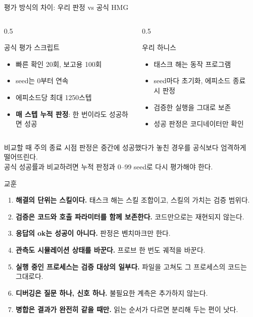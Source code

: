 \documentclass[aspectratio=169,10pt]{beamer}
\begin{document}
\begin{frame}{평가 방식의 차이: 우리 판정 vs 공식 HMG}
  \begin{columns}[T]
    \begin{column}{0.5\textwidth}
      \begin{block}{공식 평가 스크립트}
        \begin{itemize}
          \item 빠른 확인 20회, 보고용 100회
          \item seed는 0부터 연속
          \item 에피소드당 최대 1250스텝
          \item \textbf{매 스텝 누적 판정}: 한 번이라도 성공하면 성공
        \end{itemize}
      \end{block}
    \end{column}
    \begin{column}{0.5\textwidth}
      \begin{block}{우리 하니스}
        \begin{itemize}
          \item 태스크 해는 동작 프로그램
          \item seed마다 초기화, 에피소드 종료 시 판정
          \item 검증한 실행을 그대로 보존
          \item 성공 판정은 코디네이터만 확인
        \end{itemize}
      \end{block}
    \end{column}
  \end{columns}

  \vspace{0.5em}
  \begin{alertblock}{비교할 때 주의}
    종료 시점 판정은 중간에 성공했다가 놓친 경우를 공식보다 엄격하게 떨어뜨린다.\\
    공식 성공률과 비교하려면 누적 판정과 0--99 seed로 다시 평가해야 한다.
  \end{alertblock}
\end{frame}

\begin{frame}{교훈}
  \begin{enumerate}
    \item \textbf{해결의 단위는 스킬이다.} 태스크 해는 스킬 조합이고, 스킬의 가치는 검증 범위다.
    \item \textbf{검증은 코드와 호출 파라미터를 함께 보존한다.} 코드만으로는 재현되지 않는다.
    \item \textbf{응답의 ok는 성공이 아니다.} 판정은 벤치마크만 한다.
    \item \textbf{관측도 시뮬레이션 상태를 바꾼다.} 프로브 한 번도 궤적을 바꾼다.
    \item \textbf{실행 중인 프로세스는 검증 대상의 일부다.} 파일을 고쳐도 그 프로세스의 코드는 그대로다.
    \item \textbf{디버깅은 질문 하나, 신호 하나.} 불필요한 계측은 추가하지 않는다.
    \item \textbf{병합은 결과가 완전히 같을 때만.} 읽는 순서가 다르면 분리해 두는 편이 낫다.
  \end{enumerate}
\end{frame}
\end{document}
